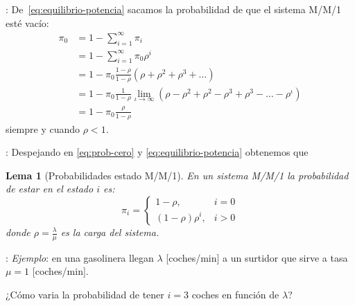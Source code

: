\documentclass[xcolor={x11names}]{beamer}
\newtheorem{lema}{Lema}[section]
\begin{document}
\begin{frame}{\secname: \subsecname}
    De~\eqref{eq:equilibrio-potencia}
    sacamos la
    probabilidad de que el sistema
    M/M/1 esté vacío:
    \begin{align}
        \pi_0 &= 1 - \sum_{i=1}^\infty \pi_i\label{eq:prob-cero}\\
              &= 1 - \sum_{i=1}^\infty \pi_0\rho^i\nonumber\\
              &= 1 - \pi_0\frac{1-\rho}{1-\rho}
        \left(\rho+\rho^2+\rho^3+\ldots  \right)\nonumber\\
        &= 1 - \pi_0\frac{1}{1-\rho}
        \lim_{\iota\to\infty}\left( \rho - \rho^2 + \rho^2 - \rho^3 + \rho^3 - \ldots - \rho^\iota \right)\nonumber\\
        &= 1 - \pi_0 \frac{\rho}{1-\rho}\nonumber
    \end{align}
    siempre y cuando $\rho<1$.
\end{frame}





\begin{frame}{\secname: \subsecname}
    Despejando en \eqref{eq:prob-cero}
    y \eqref{eq:equilibrio-potencia}
    obtenemos que

    \begin{lema}[Probabilidades estado M/M/1]
        En un sistema M/M/1 la probabilidad
        de estar en el estado $i$ es:
        \begin{equation}
            \pi_i =
            \begin{cases}
                1-\rho, & i=0\\
                (1-\rho)\rho^i, & i>0
            \end{cases}
        \end{equation}
        donde $\rho=\tfrac{\lambda}{\mu}$
        es la carga del sistema.
    \end{lema}
\end{frame}




\begin{frame}{\secname: \subsecname}
    \textit{Ejemplo}: en una gasolinera llegan
    $\lambda$ [coches/min] a un surtidor
    que sirve a tasa $\mu=1$ [coches/min].

    ¿Cómo varia la probabilidad
    de tener $i=3$ coches en función de
    $\lambda$?

    \vfill

    \begin{figure}
        
    \end{figure}
\end{frame}
\end{document}
